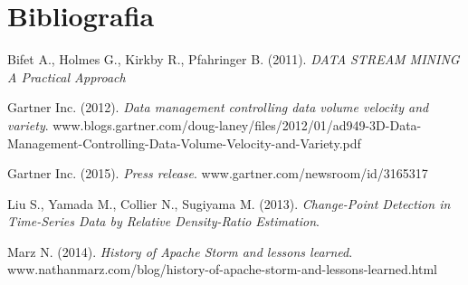 \chapter*{Bibliografia}

\begin{references}

\item
Bifet A., Holmes G., Kirkby R., Pfahringer B. (2011).
\textit{DATA STREAM MINING A Practical Approach}

\item
Gartner Inc. (2012).
\textit{Data management controlling data volume velocity and variety}.
www.blogs.gartner.com/doug-laney/files/2012/01/ad949-3D-Data-Management-Controlling-Data-Volume-Velocity-and-Variety.pdf

\item
Gartner Inc. (2015).
\textit{Press release}.
www.gartner.com/newsroom/id/3165317

\item
Liu S., Yamada M., Collier N., Sugiyama M. (2013).
\textit{Change-Point Detection in Time-Series Data by Relative Density-Ratio Estimation}.

\item
Marz N. (2014).
\textit{History of Apache Storm and lessons learned}.
www.nathanmarz.com/blog/history-of-apache-storm-and-lessons-learned.html

\end{references}
